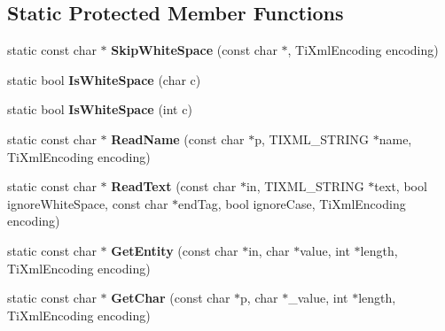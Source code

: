 \subsection*{Static Protected Member Functions}
\begin{DoxyCompactItemize}
\item 
\hypertarget{class_ti_xml_base_a6849556ca97c0a172c6b996f08287ee1}{static const char $\ast$ {\bfseries Skip\-White\-Space} (const char $\ast$, Ti\-Xml\-Encoding encoding)}\label{class_ti_xml_base_a6849556ca97c0a172c6b996f08287ee1}

\item 
\hypertarget{class_ti_xml_base_af56296d561c0bab4bc8e198cdcf5c48e}{static bool {\bfseries Is\-White\-Space} (char c)}\label{class_ti_xml_base_af56296d561c0bab4bc8e198cdcf5c48e}

\item 
\hypertarget{class_ti_xml_base_a3de391ea9f4c4a8aa10d04480b048795}{static bool {\bfseries Is\-White\-Space} (int c)}\label{class_ti_xml_base_a3de391ea9f4c4a8aa10d04480b048795}

\item 
\hypertarget{class_ti_xml_base_a910e1664e0d6a4da5d4d1bfaa51130fe}{static const char $\ast$ {\bfseries Read\-Name} (const char $\ast$p, T\-I\-X\-M\-L\-\_\-\-S\-T\-R\-I\-N\-G $\ast$name, Ti\-Xml\-Encoding encoding)}\label{class_ti_xml_base_a910e1664e0d6a4da5d4d1bfaa51130fe}

\item 
\hypertarget{class_ti_xml_base_a7f9beef90db30fa63dd35b3f992a30ca}{static const char $\ast$ {\bfseries Read\-Text} (const char $\ast$in, T\-I\-X\-M\-L\-\_\-\-S\-T\-R\-I\-N\-G $\ast$text, bool ignore\-White\-Space, const char $\ast$end\-Tag, bool ignore\-Case, Ti\-Xml\-Encoding encoding)}\label{class_ti_xml_base_a7f9beef90db30fa63dd35b3f992a30ca}

\item 
\hypertarget{class_ti_xml_base_a44f75cc7a45a97a09e509dc4c8c127e0}{static const char $\ast$ {\bfseries Get\-Entity} (const char $\ast$in, char $\ast$value, int $\ast$length, Ti\-Xml\-Encoding encoding)}\label{class_ti_xml_base_a44f75cc7a45a97a09e509dc4c8c127e0}

\item 
\hypertarget{class_ti_xml_base_a5b0fde72d6f662ae1fd6303195d2159b}{static const char $\ast$ {\bfseries Get\-Char} (const char $\ast$p, char $\ast$\-\_\-value, int $\ast$length, Ti\-Xml\-Encoding encoding)}\label{class_ti_xml_base_a5b0fde72d6f662ae1fd6303195d2159b}


\end{DoxyCompactItemize}

